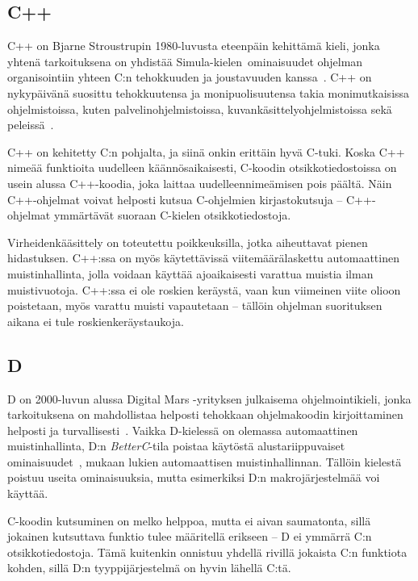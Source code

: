 \subsection{C++}

C++ on Bjarne Stroustrupin 1980-luvusta eteenpäin kehittämä kieli, jonka
yhtenä tarkoituksena on yhdistää Simula-kielen\citationneeded~ominaisuudet
ohjelman organisointiin yhteen C:n tehokkuuden ja joustavuuden
kanssa~\citep{cpphistory}. C++ on nykypäivänä suosittu tehokkuutensa ja
monipuolisuutensa takia monimutkaisissa ohjelmistoissa, kuten
palvelinohjelmistoissa, kuvankäsittelyohjelmistoissa sekä
peleissä~\citep{cppapps}.

C++ on kehitetty C:n pohjalta, ja siinä onkin erittäin hyvä C-tuki. Koska C++
nimeää funktioita uudelleen käännösaikaisesti, C-koodin
otsikkotiedostoissa on usein alussa C++-koodia, joka
laittaa uudelleennimeämisen pois päältä. Näin C++-ohjelmat voivat helposti
kutsua C-ohjelmien kirjastokutsuja -- C++-ohjelmat ymmärtävät suoraan C-kielen
otsikkotiedostoja.

Virheidenkääsittely on toteutettu poikkeuksilla, jotka aiheuttavat pienen
hidastuksen. C++:ssa on myös käytettävissä viitemäärälaskettu automaattinen muistinhallinta, jolla voidaan käyttää ajoaikaisesti
varattua muistia ilman muistivuotoja. C++:ssa ei ole roskien keräystä, vaan kun
viimeinen viite olioon poistetaan, myös varattu muisti vapautetaan -- tällöin
ohjelman suorituksen aikana ei tule roskienkeräystaukoja.

\subsection{D}

D on 2000-luvun alussa Digital Mars -yrityksen julkaisema ohjelmointikieli,
jonka tarkoituksena on mahdollistaa helposti tehokkaan ohjelmakoodin
kirjoittaminen helposti ja turvallisesti~\citep{dhistory}. Vaikka D-kielessä on
olemassa automaattinen muistinhallinta, D:n \emph{BetterC}-tila poistaa
käytöstä alustariippuvaiset ominaisuudet~\citep{dbetterc}, mukaan lukien
automaattisen muistinhallinnan. Tällöin kielestä poistuu useita ominaisuuksia,
mutta esimerkiksi D:n makrojärjestelmää voi käyttää.

C-koodin kutsuminen on melko helppoa, mutta ei aivan saumatonta, sillä jokainen
kutsuttava funktio tulee määritellä erikseen -- D ei ymmärrä C:n
otsikkotiedostoja. Tämä kuitenkin onnistuu yhdellä rivillä jokaista C:n
funktiota kohden, sillä D:n tyyppijärjestelmä on hyvin lähellä C:tä.

